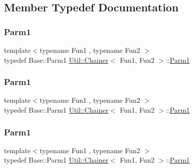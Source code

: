 \subsection{Member Typedef Documentation}
\mbox{\label{classUtil_1_1Chainer_a3e09b2267dabdd8d12070b09c47749c6}} 
\subsubsection{\texorpdfstring{Parm1}{Parm1}\hspace{0.1cm}{\footnotesize\ttfamily [1/3]}}
{\footnotesize\ttfamily template$<$typename Fun1 , typename Fun2 $>$ \\
typedef Base\+::\+Parm1 \mbox{\hyperlink{classUtil_1_1Chainer}{Util\+::\+Chainer}}$<$ Fun1, Fun2 $>$\+::\mbox{\hyperlink{classUtil_1_1Chainer_a3e09b2267dabdd8d12070b09c47749c6}{Parm1}}}

\mbox{\label{classUtil_1_1Chainer_a3e09b2267dabdd8d12070b09c47749c6}} 
\subsubsection{\texorpdfstring{Parm1}{Parm1}\hspace{0.1cm}{\footnotesize\ttfamily [2/3]}}
{\footnotesize\ttfamily template$<$typename Fun1 , typename Fun2 $>$ \\
typedef Base\+::\+Parm1 \mbox{\hyperlink{classUtil_1_1Chainer}{Util\+::\+Chainer}}$<$ Fun1, Fun2 $>$\+::\mbox{\hyperlink{classUtil_1_1Chainer_a3e09b2267dabdd8d12070b09c47749c6}{Parm1}}}

\mbox{\label{classUtil_1_1Chainer_a3e09b2267dabdd8d12070b09c47749c6}} 
\subsubsection{\texorpdfstring{Parm1}{Parm1}\hspace{0.1cm}{\footnotesize\ttfamily [3/3]}}
{\footnotesize\ttfamily template$<$typename Fun1 , typename Fun2 $>$ \\
typedef Base\+::\+Parm1 \mbox{\hyperlink{classUtil_1_1Chainer}{Util\+::\+Chainer}}$<$ Fun1, Fun2 $>$\+::\mbox{\hyperlink{classUtil_1_1Chainer_a3e09b2267dabdd8d12070b09c47749c6}{Parm1}}}

